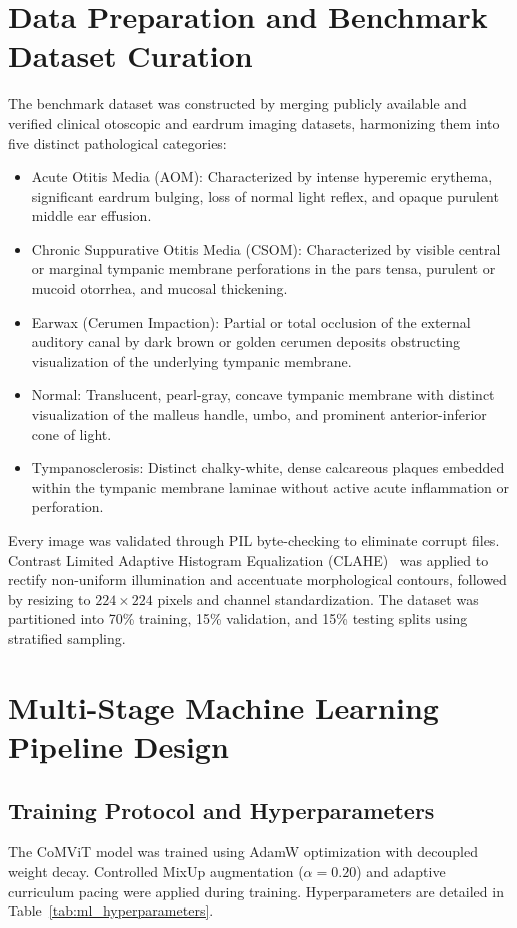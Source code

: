 \documentclass[12pt,a4paper]{report}
\renewcommand{\textbf}[1]{#1}
\begin{document}
\section{Data Preparation and Benchmark Dataset Curation}
The benchmark dataset was constructed by merging publicly available and verified clinical otoscopic and eardrum imaging datasets, harmonizing them into five distinct pathological categories:
\begin{itemize}
    \item \textbf{Acute Otitis Media (AOM):} Characterized by intense hyperemic erythema, significant eardrum bulging, loss of normal light reflex, and opaque purulent middle ear effusion.
    \item \textbf{Chronic Suppurative Otitis Media (CSOM):} Characterized by visible central or marginal tympanic membrane perforations in the pars tensa, purulent or mucoid otorrhea, and mucosal thickening.
    \item \textbf{Earwax (Cerumen Impaction):} Partial or total occlusion of the external auditory canal by dark brown or golden cerumen deposits obstructing visualization of the underlying tympanic membrane.
    \item \textbf{Normal:} Translucent, pearl-gray, concave tympanic membrane with distinct visualization of the malleus handle, umbo, and prominent anterior-inferior cone of light.
    \item \textbf{Tympanosclerosis:} Distinct chalky-white, dense calcareous plaques embedded within the tympanic membrane laminae without active acute inflammation or perforation.
\end{itemize}

Every image was validated through PIL byte-checking to eliminate corrupt files. Contrast Limited Adaptive Histogram Equalization (CLAHE)~\cite{ref_reza2004_clahe} was applied to rectify non-uniform illumination and accentuate morphological contours, followed by resizing to $224 \times 224$ pixels and channel standardization. The dataset was partitioned into 70\% training, 15\% validation, and 15\% testing splits using stratified sampling.

\section{Multi-Stage Machine Learning Pipeline Design}

\subsection{Training Protocol and Hyperparameters}
The CoMViT model was trained using AdamW optimization with decoupled weight decay. Controlled MixUp augmentation ($\alpha = 0.20$) and adaptive curriculum pacing were applied during training. Hyperparameters are detailed in Table~\ref{tab:ml_hyperparameters}.
\end{document}
